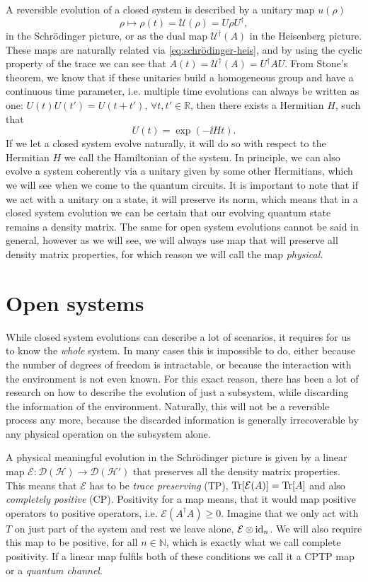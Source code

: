 A reversible evolution of a closed system is described by a unitary map $u(\rho)$
\begin{equation}
    \label{eq:unitary-map}
    \rho \mapsto \rho(t) = \mathcal{U}(\rho) = U \rho U^\dagger,
\end{equation}
in the Schrödinger picture, or as the dual map $\mathcal{U}^\dagger(A)$ in the Heisenberg picture. These maps are naturally related via \eqref{eq:schrödinger-heis}, and by using the cyclic property of the trace we can see that $A(t) = \mathcal{U}^\dagger(A) = U^\dagger A U$. From Stone's theorem, we know that if these unitaries build a homogeneous group and have a continuous time parameter, i.e. multiple time evolutions can always be written as one: $U(t) U(t') = U(t + t'),\,\forall t, t'\in\mathbb{R}$, then there exists a Hermitian $H$, such that
$$
U(t) = \exp (-\ii H t).
$$
If we let a closed system evolve naturally, it will do so with respect to the Hermitian $H$ we call the Hamiltonian of the system. In principle, we can also evolve a system coherently via a unitary given by some other Hermitians, which we will see when we come to the quantum circuits. It is important to note that if we act with a unitary on a state, it will preserve its norm, which means that in a closed system evolution we can be certain that our evolving quantum state remains a density matrix. The same for open system evolutions cannot be said in general, however as we will see, we will always use map that will preserve all density matrix properties, for which reason we will call the map \textit{physical.}
\section{Open systems} \label{sec:OQS}
While closed system evolutions can describe a lot of scenarios, it requires for us to know the \textit{whole} system. In many cases this is impossible to do, either because the number of degrees of freedom is intractable, or because the interaction with the environment is not even known. 
For this exact reason, there has been a lot of research on how to describe the evolution of just a subsystem, while discarding the information of the environment. Naturally, this will not be a reversible process any more, because the discarded information is generally irrecoverable by any physical operation on the subsystem alone. 

A physical meaningful evolution in the Schrödinger picture is given by a linear map $\mathcal{E}: \mathcal{D}(\mathcal{H}) \rightarrow \mathcal{D}(\mathcal{H}')$ that preserves all the density matrix properties. 
This means that $\mathcal{E}$ has to be \textit{trace preserving} (TP), $\operatorname{Tr}[\mathcal{E}(A)] = \operatorname{Tr}[A]$ and also \textit{completely positive} (CP). Positivity for a map means, that it would map positive operators to positive operators, i.e. $\mathcal{E}(A^\dagger A) \geq 0$. Imagine that we only act with $T$ on just part of the system and rest we leave alone, $\mathcal{E}\otimes \operatorname{id}_n$. We will also require this map to be positive, for all $n \in \mathbb{N}$, which is exactly what we call complete positivity. If a linear map fulfils both of these conditions we call it a CPTP map or a \textit{quantum channel}. 

